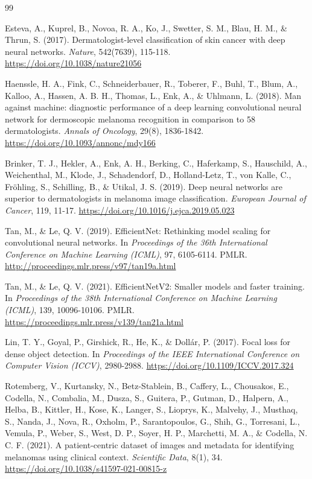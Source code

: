 \documentclass[12pt,a4paper]{article}
\begin{document}
\begin{thebibliography}{99}

Esteva, A., Kuprel, B., Novoa, R. A., Ko, J., Swetter, S. M., Blau, H. M., \& Thrun, S. (2017). Dermatologist-level classification of skin cancer with deep neural networks. \textit{Nature}, 542(7639), 115-118. \url{https://doi.org/10.1038/nature21056}

Haenssle, H. A., Fink, C., Schneiderbauer, R., Toberer, F., Buhl, T., Blum, A., Kalloo, A., Hassen, A. B. H., Thomas, L., Enk, A., \& Uhlmann, L. (2018). Man against machine: diagnostic performance of a deep learning convolutional neural network for dermoscopic melanoma recognition in comparison to 58 dermatologists. \textit{Annals of Oncology}, 29(8), 1836-1842. \url{https://doi.org/10.1093/annonc/mdy166}

Brinker, T. J., Hekler, A., Enk, A. H., Berking, C., Haferkamp, S., Hauschild, A., Weichenthal, M., Klode, J., Schadendorf, D., Holland-Letz, T., von Kalle, C., Fröhling, S., Schilling, B., \& Utikal, J. S. (2019). Deep neural networks are superior to dermatologists in melanoma image classification. \textit{European Journal of Cancer}, 119, 11-17. \url{https://doi.org/10.1016/j.ejca.2019.05.023}

Tan, M., \& Le, Q. V. (2019). EfficientNet: Rethinking model scaling for convolutional neural networks. In \textit{Proceedings of the 36th International Conference on Machine Learning (ICML)}, 97, 6105-6114. PMLR. \url{http://proceedings.mlr.press/v97/tan19a.html}

Tan, M., \& Le, Q. V. (2021). EfficientNetV2: Smaller models and faster training. In \textit{Proceedings of the 38th International Conference on Machine Learning (ICML)}, 139, 10096-10106. PMLR. \url{https://proceedings.mlr.press/v139/tan21a.html}

Lin, T. Y., Goyal, P., Girshick, R., He, K., \& Dollár, P. (2017). Focal loss for dense object detection. In \textit{Proceedings of the IEEE International Conference on Computer Vision (ICCV)}, 2980-2988. \url{https://doi.org/10.1109/ICCV.2017.324}

Rotemberg, V., Kurtansky, N., Betz-Stablein, B., Caffery, L., Chousakos, E., Codella, N., Combalia, M., Dusza, S., Guitera, P., Gutman, D., Halpern, A., Helba, B., Kittler, H., Kose, K., Langer, S., Lioprys, K., Malvehy, J., Musthaq, S., Nanda, J., Nova, R., Oxholm, P., Sarantopoulos, G., Shih, G., Torresani, L., Vemula, P., Weber, S., West, D. P., Soyer, H. P., Marchetti, M. A., \& Codella, N. C. F. (2021). A patient-centric dataset of images and metadata for identifying melanomas using clinical context. \textit{Scientific Data}, 8(1), 34. \url{https://doi.org/10.1038/s41597-021-00815-z}


\end{thebibliography}
\end{document}
